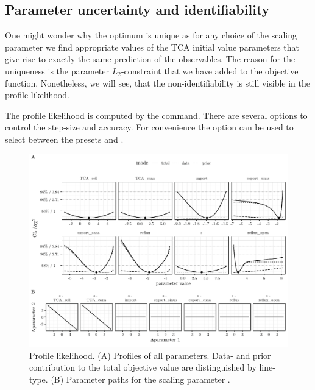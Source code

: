 \documentclass[article]{jss}
\begin{document}
\subsection{Parameter uncertainty and identifiability}
\label{chap_uncertainty}

One might wonder why the optimum is unique as for any choice of the scaling parameter  we find appropriate values of the TCA initial value parameters that give rise to exactly the same prediction of the observables. The reason for the uniqueness is the parameter $L_2$-constraint that we have added to the objective function. Nonetheless, we will see, that the non-identifiability is still visible in the profile likelihood.

The profile likelihood is computed by the  command. There are several options to control the step-size and accuracy. For convenience the  option can be used to select between the presets  and .

\begin{figure}[t!]
\centering
\includegraphics[width = \textwidth]{Figures/figure7}
\caption{Profile likelihood. (A) Profiles of all parameters. Data- and prior contribution to the total objective value are distinguished by line-type. (B) Parameter paths for the scaling parameter .\label{fig:pl}}
\end{figure}
\end{document}

